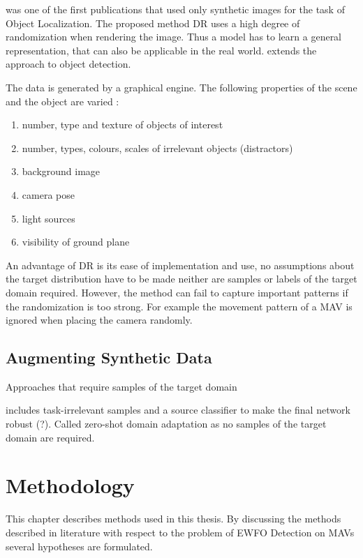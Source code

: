 \cite{Tobin2017} was one of the first publications that used only synthetic images for the task of Object Localization. The proposed method \ac{DR} uses a high degree of randomization when rendering the image. Thus a model has to learn a general representation, that can also be applicable in the real world. \cite{Tremblay2018a} extends the approach to object detection.

The data is generated by a graphical engine. The following properties of the scene and the object are varied \cite{Tremblay2018a}:

\begin{enumerate}
	\item number, type and texture of objects of interest
	\item number, types, colours, scales of irrelevant objects (distractors)
	\item background image
	\item camera pose
	\item light sources
	\item visibility of ground plane
\end{enumerate}

An advantage of \ac{DR} is its ease of implementation and use, no assumptions about the target distribution have to be made neither are samples or labels of the target domain required. However, the method can fail to capture important patterns if the randomization is too strong. For example the movement pattern of a \ac{MAV} is ignored when placing the camera randomly.


\subsection{Augmenting Synthetic Data}


Approaches that require samples of the target domain \cite{Chen2018c} \cite{Xu2017} \cite{Inoue} 

\cite{Peng2017} includes task-irrelevant samples and a source classifier to make the final network robust (?). Called zero-shot domain adaptation as no samples of the target domain are required.


\cite{Vass}




\section{Methodology}
\label{sec:training:meth}

This chapter describes methods used in this thesis. By discussing the methods described in literature with respect to the problem of \ac{EWFO} Detection on \acp{MAV} several hypotheses are formulated.

